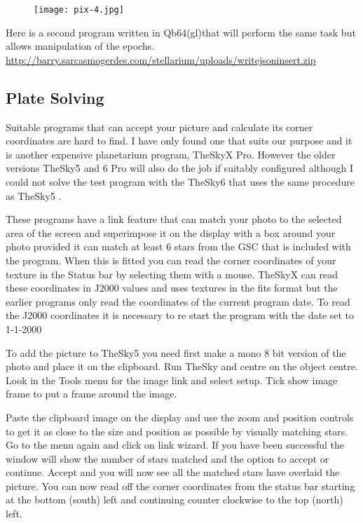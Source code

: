 \begin{figure}[h]
\centering\texttt{[image: pix-4.jpg]}
\end{figure}

Here is a second program written in Qb64(gl)that will perform the same
task but allows manipulation of the epochs.
\url{http://barry.sarcasmogerdes.com/stellarium/uploads/writejsoninsert.zip}

\subsection{Plate Solving}\label{plate-solving}

Suitable programs that can accept your picture and calculate its corner
coordinates are hard to find. I have only found one that suits our
purpose and it is another expensive planetarium program, TheSkyX Pro.
However the older versions TheSky5 and 6 Pro will also do the job if
suitably configured although I could not solve the test program with the
TheSky6 that uses the same procedure as TheSky5 .

These programs have a link feature that can match your photo to the
selected area of the screen and superimpose it on the display with a box
around your photo provided it can match at least 6 stars from the GSC
that is included with the program. When this is fitted you can read the
corner coordinates of your texture in the Status bar by selecting them
with a mouse. TheSkyX can read these coordinates in J2000 values and
uses textures in the fits format but the earlier programs only read the
coordinates of the current program date. To read the J2000 coordinates
it is necessary to re start the program with the date set to 1-1-2000

To add the picture to TheSky5 you need first make a mono 8 bit version
of the photo and place it on the clipboard. Run TheSky and centre on the
object centre. Look in the Tools menu for the image link and select
setup. Tick show image frame to put a frame around the image.

Paste the clipboard image on the display and use the zoom and position
controls to get it as close to the size and position as possible by
visually matching stars. Go to the menu again and click on link wizard.
If you have been successful the window will show the number of stars
matched and the option to accept or continue. Accept and you will now
see all the matched stars have overlaid the picture. You can now read
off the corner coordinates from the status bar starting at the bottom
(south) left and continuing counter clockwise to the top (north) left.

